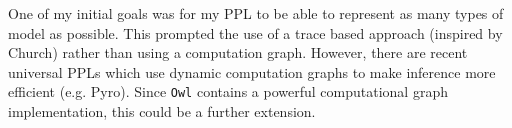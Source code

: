 \documentclass[sigconf]{acmart}
\begin{document}
One of my initial goals was for my PPL to be able to represent as many types of model as possible. This prompted the use of a trace based approach (inspired by Church) rather than using a computation graph. However, there are recent universal PPLs which use dynamic computation graphs to make inference more efficient (e.g. Pyro). Since \texttt{Owl} contains a powerful computational graph implementation, this could be a further extension.


{
  \clearpage
  
  
}

\appendix
\end{document}
